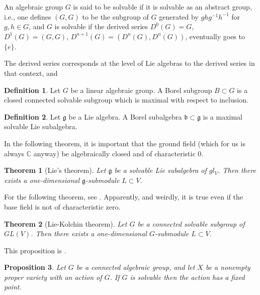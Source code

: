 \documentclass[12pt]{article}
\theoremstyle{plain}
\newtheorem{thm}{Theorem}[section]
\newtheorem{prop}[thm]{Proposition}
\theoremstyle{definition}
\newtheorem{defn}{Definition}[section]
\numberwithin{equation}{section}
\newcommand{\C}{\mathbb{C}}
\newcommand{\frakb}{\mathfrak{b}}
\newcommand{\g}{\mathfrak{g}}
\begin{document}
An algebraic group $G$ is said to be solvable if it is solvable as an abstract group, i.e., one defines $(G, G)$ to be the subgroup of $G$ generated by $ghg^{-1}h^{-1}$ for $g, h \in G$, and $G$ is solvable if the derived series $D^0(G) = G$, $D^1(G) = (G, G)$, $D^{n+1}(G) = (D^n(G), D^n(G))$, eventually goes to $\{e\}$.

The derived series corresponds at the level of Lie algebras to the derived series in that context, and
\begin{defn}
Let $G$ be a linear algebraic group. A Borel subgroup $B \subset G$ is a closed connected solvable subgroup which is maximal with respect to inclusion.
\end{defn}

\begin{defn}
Let $\g$ be a Lie algebra. A Borel subalgebra $\frakb \subset \g$ is a maximal solvable Lie subalgebra.
\end{defn}

In the following theorem, it is important that the ground field (which for us is always $\C$ anyway) be algebraically closed and of characteristic $0$.
\begin{thm}[Lie's theorem]
Let $\g$ be a solvable Lie subalgebra of $gl_V$. Then there exists a one-dimensional $\g$-submodule $L \subset V$.
\end{thm}

For the following theorem, see {\cite[17.6]{Humphreys.alg.grp}}. Apparently, and weirdly, it is true even if the base field is not of characteristic zero.
\begin{thm}[Lie-Kolchin theorem]\label{thm:Lie-Kolchin}
Let $G$ be a connected solvable subgroup of $GL(V)$. Then there exists a one-dimensional $G$-submodule $L \subset V$.
\end{thm}


This proposition is {\cite[21.2]{Humphreys.alg.grp}}.
\begin{prop}
Let $G$ be a connected algebraic group, and let $X$ be a nonempty proper variety with an action of $G$. If $G$ is solvable then the action has a fixed point.
\end{prop}
\end{document}
